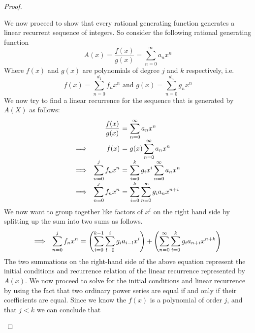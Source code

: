 \begin{proof}
\begin{itemize}
                    We now proceed to show that every rational generating function generates a linear recurrent sequence of integers.
                    So consider the following rational generating function
                    \begin{equation}
                        A(x) = \frac{f(x)}{g(x)} = \sum_{n = 0}^{\infty} a_n x^n
                    \end{equation}
                    Where $f(x)$ and $g(x)$ are polynomials of degree $j$ and $k$ respectively, i.e.
                    \[
                        f(x) = \sum_{n = 0}^{d_1} f_n x^n \mbox{ and } g(x) = \sum_{n = 0}^{d_n} g_n x^n
                    \]
                    We now try to find a linear recurrence for the sequence that is generated by $A(X)$
                    as follows:
                    \[\begin{array}{rr@{\ = \ }l}
                              & \dfrac{f(x)}{g(x)} & \dsum_{n = 0}^{\infty} a_n x^n\\
                        \then & f(x) & g(x) \dsum_{n = 0}^{\infty} a_n x^n \\
                        \then & \dsum_{n = 0}^{j} f_n x^n & \dsum_{i = 0}^{k} g_i x^i \dsum_{n = 0}^{\infty} a_n x^n \\
                        \then & \dsum_{n = 0}^{j} f_n x^n & \dsum_{i = 0}^{k} \dsum_{n = 0}^{\infty} g_i a_n x^{n + i} \\
                    \end{array}\]
                    We now want to group together like factors of $x^i$ on the right hand side by splitting up the
                    sum into two sums as follows.
                    \[\begin{array}{rr@{\ = \ }l}
                        \then & \dsum_{n = 0}^{j} f_n x^n & \left(\dsum_{i = 0}^{k - 1} \dsum_{l = 0}^{i} g_i a_{i - l} x^i\right) + \left(\dsum_{n = 0}^{\infty} \dsum_{i = 0}^{k} g_i a_{n + i} x^{n + k}\right)
                    \end{array}\]
                    The two summations on the right-hand side of the above equation represent the initial conditions and recurrence relation
                    of the linear recurrence represented by $A(x)$. We now proceed to solve for the initial conditions and linear
                    recurrence by using the fact that two ordinary power series are equal if and only if their coefficients are equal.
                    Since we know the $f(x)$ is a polynomial of order $j$, and that $j < k$ we can conclude that

\end{itemize}
\end{proof}
